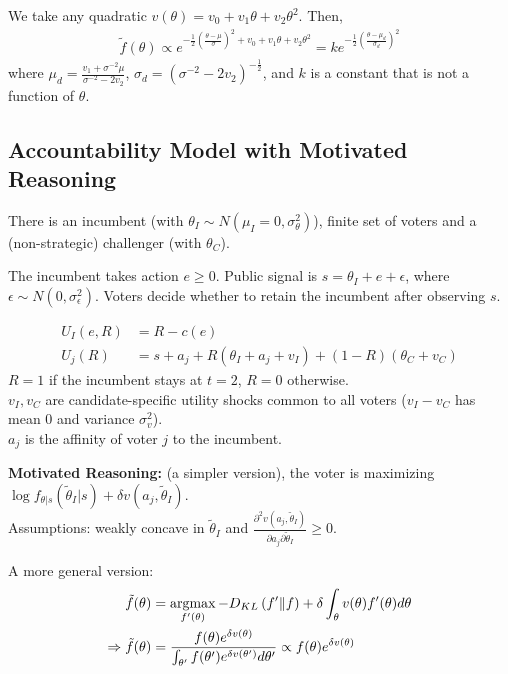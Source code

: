 \documentclass[11pt]{elegantbook}
\newcommand{\argmax}{\operatornamewithlimits{argmax}}
\begin{document}
We take any quadratic $v(\theta)=v_0+v_1\theta+v_2\theta^2$. Then,
\begin{equation}
    \begin{aligned}
        \tilde{f}(\theta) \propto e^{-\frac{1}{2}\left(\frac{\theta-\mu}{\sigma}\right)^2+v_0+v_1\theta+v_2\theta^2}=k e^{-\frac{1}{2}\left(\frac{\theta-\mu_d}{\sigma_d}\right)^2}
    \end{aligned}
    \nonumber
\end{equation}
where $\mu_d=\frac{v_1+\sigma^{-2}\mu}{\sigma^{-2}-2v_2}$, $\sigma_d=\left(\sigma^{-2}-2v_2\right)^{-\frac{1}{2}}$, and $k$ is a constant that is not a function of $\theta$.


\subsection{Accountability Model with Motivated Reasoning}
There is an incumbent (with $\theta_I\sim N(\mu_I=0,\sigma_\theta^2)$), finite set of voters and a (non-strategic) challenger (with $\theta_C$).

The incumbent takes action $e\geq 0$. Public signal is $s=\theta_I+e+\epsilon$, where $\epsilon\sim N(0,\sigma_\epsilon^2)$. Voters decide whether to retain the incumbent after observing $s$.

\begin{equation}
    \begin{aligned}
        U_I(e,R)&=R-c(e)\\
        U_j(R)&=s+a_j+R(\theta_I+a_j+v_I)+(1-R)(\theta_C+v_C)
    \end{aligned}
    \nonumber
\end{equation}
$R=1$ if the incumbent stays at $t=2$, $R=0$ otherwise.\\
$v_I,v_C$ are candidate-specific utility shocks common to all voters ($v_I-v_C$ has mean $0$ and variance $\sigma_v^2$).\\
$a_j$ is the affinity of voter $j$ to the incumbent.

\textbf{Motivated Reasoning:} (a simpler version), the voter is maximizing $\log f_{\theta|s}(\tilde{\theta}_I|s)+\delta v(a_j,\tilde{\theta}_I)$.\\
Assumptions: weakly concave in $\tilde{\theta}_I$ and $\frac{\partial^2 v(a_j,\tilde{\theta}_I)}{\partial a_j \partial \tilde{\theta}_I}\geq 0$.

A more general version:
\begin{equation}
    \begin{aligned}
        \tilde{f}(\theta)&=\argmax_{f'(\theta)}-D_{KL}\left(f'\|f\right)+\delta\int_{\theta} v(\theta) f'(\theta) d\theta\\
        \Rightarrow \tilde{f}(\theta)&=\frac{f(\theta)e^{\delta v(\theta)}}{\int_{\theta'} f(\theta') e^{\delta v(\theta')}d\theta'} \propto f(\theta)e^{\delta v(\theta)}
    \end{aligned}
    \nonumber
\end{equation}
\end{document}
